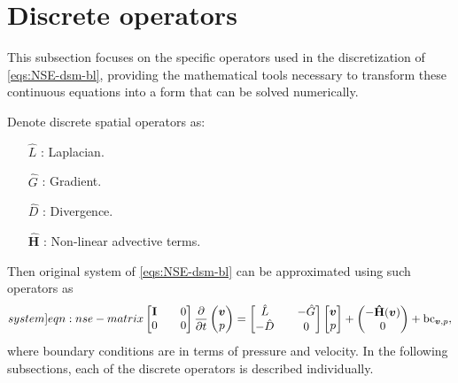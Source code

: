 \documentclass{article}
\numberwithin{equation}{section}
\begin{document}
\pagebreak
\section{Discrete operators}\label{sec:discrete-operators}

This subsection focuses on the specific operators used in the discretization of \cref{eqs:NSE-dsm-bl}, providing the mathematical tools necessary to transform these continuous equations into a form that can be solved numerically.

Denote discrete spatial operators as:
\begin{enumerate}
	\item[$\hat{L}$]:  Laplacian.
	\item[$\hat{G}$]: Gradient.
	\item[$\hat{D}$]: Divergence.
	\item[$\mathbf{\hat{H}}$]: Non-linear advective terms.
\end{enumerate}
Then original system of \cref{eqs:NSE-dsm-bl} can be approximated using such operators as
\begin{equation}\label[system]{eqn:nse-matrix}
            \begin{bmatrix}
                  \mathbf{I} && 0 \\ 
                  0 && 0
            \end{bmatrix}
            \frac{\partial }{\partial t} 
            \begin{pmatrix}
                  \boldsymbol{v} \\ 
                  p
            \end{pmatrix}
            =
            \begin{bmatrix}
                  \hat{L} && - \hat{G} \\ 
                  -\hat{D} && 0
            \end{bmatrix}
            \begin{bmatrix}
                  \boldsymbol{v} \\
                  p
            \end{bmatrix}
            +
            \begin{pmatrix}
                  -\mathbf{\hat{H}}(\boldsymbol{v})\\
                  0
            \end{pmatrix} + \text{bc}_{\boldsymbol{v},p},
        \end{equation}
where boundary conditions are in terms of pressure and velocity. In the following subsections, each of the discrete operators is described individually. 
\end{document}
